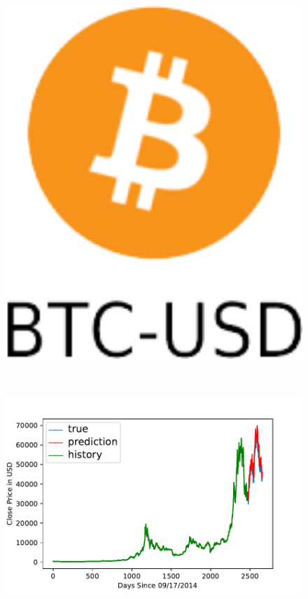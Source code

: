 \begin{figure}[p]
\begin{minipage}{.05\textwidth}
\includegraphics[width=1.0\textwidth]{images/btc-usd.png}
\end{minipage}
\ \
\begin{minipage}{.4\textwidth}
\includegraphics[width=1.0\textwidth]{images/BTC-USD-prediction-model.pdf}

\end{minipage}
\end{figure}
